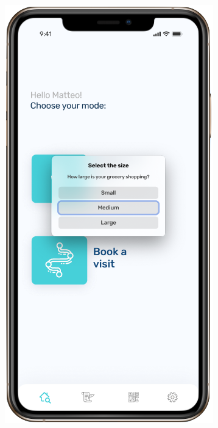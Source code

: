 \begin{figure}[H]
\begin{center}
{           \includegraphics[scale=0.35]{images/mockup/reservation_size.png}
        }\\ %
\end{center}
\end{figure}
